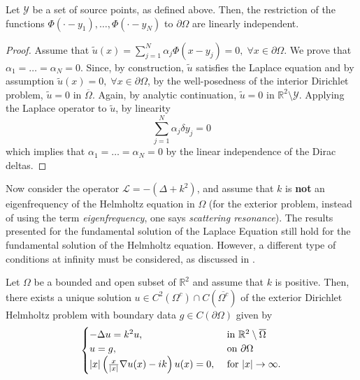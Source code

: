 \begin{theorem}\label{lapl_li}
    Let \(\mathcal{Y}\) be a set of source points, as defined above. Then, the restriction of the functions \(\Phi(\cdot-y_1),\dots,\Phi(\cdot-y_N)\) to \(\partial\Omega\) are linearly independent.
\end{theorem}
\begin{proof}
    Assume that \(\tilde{u}(x) = \sum_{j=1}^{N}\alpha_j \Phi(x-y_j) = 0, \; \forall x \in \partial\Omega\). We prove that \(\alpha_1=\dots=\alpha_N = 0\). Since, by construction, \(\tilde{u}\) satisfies the Laplace equation and by assumption \(\tilde{u}(x) = 0, \; \forall x \in \partial\Omega\), by the well-posedness of the interior Dirichlet problem, \(\tilde{u} = 0\) in \(\overline{\Omega}\). Again, by analytic continuation, \(\tilde{u} = 0\) in \(\mathbb{R}^2\setminus\mathcal{Y}\). Applying the Laplace operator to \(\tilde{u}\), by linearity
    \[
        \sum_{j=1}^{N}\alpha_j \delta{y_j} = 0
    \]
    which implies that \(\alpha_1=\dots=\alpha_N = 0\) by the linear independence of the Dirac deltas.
\end{proof}

Now consider the operator \(\mathcal{L} = -(\Delta + k^2)\), and assume that \(k\) is \textbf{not} an eigenfrequency of the Helmholtz equation in \(\Omega\) (for the exterior problem, instead of using the term \textit{eigenfrequency}, one says \textit{scattering resonance}). The results presented for the fundamental solution of the Laplace Equation still hold for the fundamental solution of the Helmholtz equation. However, a different type of conditions at infinity must be considered, as discussed in \cite{colton2013integral}.

\begin{theorem}
    Let \(\Omega\) be a bounded and open subset of \(\mathbb{R}^2\) and assume that \(k\) is positive. Then, there exists a unique solution \(u \in C^2(\Omega^c) \cap C(\overline{\Omega^c})\) of the exterior Dirichlet Helmholtz problem with boundary data \(g \in C(\partial\Omega)\) given by
    \[
        \begin{cases}
            -\Delta u = k^2 u, & \text{ in }  \mathbb{R}^2\setminus \overline{\Omega}\\
            u = g, & \text{ on }  \partial \Omega\\
            \abs{x} \left(\frac{x}{\abs{x}}\nabla u(x) - i k\right)u(x) = 0, & \text{ for }  \abs{x} \rightarrow \infty.
        \end{cases}
    \]
\end{theorem}

